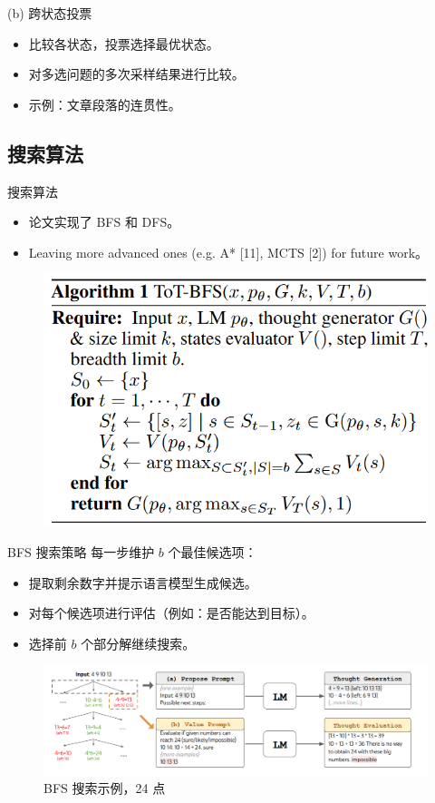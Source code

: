 \begin{frame}{(b) 跨状态投票}
\begin{itemize}
    \item 比较各状态，投票选择最优状态。
	\bigskip
    \item 对多选问题的多次采样结果进行比较。
	\bigskip
    \item 示例：文章段落的连贯性。
\end{itemize}
\end{frame}

\subsection{搜索算法}

\begin{frame}{搜索算法}
\begin{itemize}
    \item 论文实现了 BFS 和 DFS。
    \item Leaving more advanced ones (e.g. A* [11], MCTS [2]) for future work。
\end{itemize}
\begin{figure}
	\centering
	\includegraphics[width=.5\linewidth]{./pic/9.png}
\end{figure}
\end{frame}

\begin{frame}{BFS 搜索策略}
每一步维护 $b$ 个最佳候选项：
\begin{itemize}
    \item 提取剩余数字并提示语言模型生成候选。
    \item 对每个候选项进行评估（例如：是否能达到目标）。
    \item 选择前 $b$ 个部分解继续搜索。
\end{itemize}
\begin{figure}
	\centering
	\includegraphics[width=.8\linewidth]{./pic/10.png}
	\caption{BFS 搜索示例，24 点}
\end{figure}
\end{frame}

